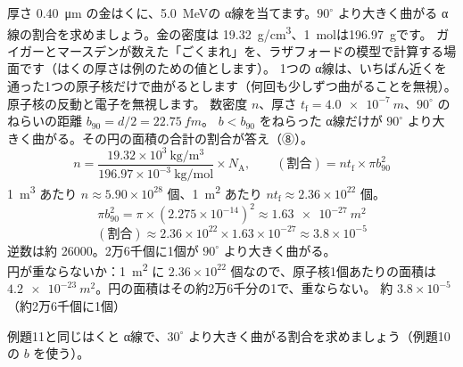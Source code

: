 \label{ph:原-1:ex11}
\begin{phreidai}
厚さ \qty{0.40}{\micro m} の金はくに、\qty{5.0}{MeV}の α線を当てます。$90^\circ$ より大きく曲がる α線の割合を求めましょう。金の密度は \qty{19.32}{g/cm^3}、\qty{1}{mol}は\qty{196.97}{g}です。
\phbamen
ガイガーとマースデンが数えた「ごくまれ」を、ラザフォードの模型で計算する場面です（はくの厚さは例のための値とします）。
\phmushi
1つの α線は、いちばん近くを通った1つの原子核だけで曲がるとします（何回も少しずつ曲がることを無視）。原子核の反動と電子を無視します。
\phzu
数密度 $n$、厚さ $t_{\mathrm f}=\qty{4.0e-7}{m}$、$90^\circ$ のねらいの距離 $b_{90}=d/2=\qty{22.75}{fm}$。
\phriyu
$b<b_{90}$ をねらった α線だけが $90^\circ$ より大きく曲がる。その円の面積の合計の割合が答え（⑧）。
\phtateru
\[ n=\frac{19.32\times10^3\ \mathrm{kg/m^3}}{196.97\times10^{-3}\ \mathrm{kg/mol}}\times N_{\mathrm A},\qquad(\text{割合})=nt_{\mathrm f}\times\pi b_{90}^2 \]
\phtoku
\qty{1}{m^3} あたり $n\approx5.90\times10^{28}$ 個、\qty{1}{m^2} あたり $nt_{\mathrm f}\approx2.36\times10^{22}$ 個。
\[ \pi b_{90}^2=\pi\times(2.275\times10^{-14})^2\approx\qty{1.63e-27}{m^2} \]
\[ (\text{割合})\approx2.36\times10^{22}\times1.63\times10^{-27}\approx3.8\times10^{-5} \]
\phtashikame
逆数は約 \num{26000}。2万6千個に1個が $90^\circ$ より大きく曲がる。\\
円が重ならないか：\qty{1}{m^2} に $2.36\times10^{22}$ 個なので、原子核1個あたりの面積は $\qty{4.2e-23}{m^2}$。円の面積はその約2万6千分の1で、重ならない。
\kotae 約 $3.8\times10^{-5}$（約2万6千個に1個）
\end{phreidai}
\begin{jibun}
例題11と同じはくと α線で、$30^\circ$ より大きく曲がる割合を求めましょう（例題10の $b$ を使う）。
\end{jibun}

